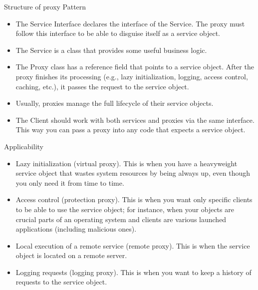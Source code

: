 \documentclass[13pt]{beamer}
\begin{document}
\begin{frame}{Structure of proxy Pattern}
	\begin{itemize}
		\setlength\itemsep{1em}
		\item  The Service Interface declares the interface of the Service. The proxy must follow this interface to be able to disguise itself as a service object.
		\item The Service is a class that provides some useful business logic.
		\item The Proxy class has a reference field that points to a service object. After the proxy finishes its processing (e.g., lazy initialization, logging, access control, caching, etc.), it passes the request to the service object.
		\item Usually, proxies manage the full lifecycle of their service objects.
		\item The Client should work with both services and proxies via the same interface. This way you can pass a proxy into any code that expects a service object.
	\end{itemize}
\end{frame}

\begin{frame}{Applicability}
	\begin{itemize}
		\item Lazy initialization (virtual proxy). This is when you have a heavyweight service object that wastes system resources by being always up, even though you only need it from time to time.
		\item Access control (protection proxy). This is when you want only specific clients to be able to use the service object; for instance, when your objects are crucial parts of an operating system and clients are various launched applications (including malicious ones).
		\item Local execution of a remote service (remote proxy). This is when the service object is located on a remote server.
		\item Logging requests (logging proxy). This is when you want to keep a history of requests to the service object.
	\end{itemize}
\end{frame}
\end{document}
